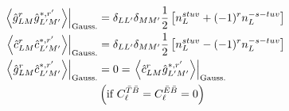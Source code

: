 \documentclass{article}
\newcommand{\av}[1]{\left\langle #1 \right\rangle}
\begin{document}
\begin{equation}
\begin{split}
\left.\av{\hat g^{r}_{LM} \hat g^{*, r'}_{L' M'} }\right|_{\rm Gauss.} &=\delta_{LL'}\delta_{MM'} \frac 12 \left[n_L^{stuv} +  (-1)^{r} n^{-s-tuv}_L\right] \\
		\left.\av{\hat c^{r}_{LM} \hat c^{*, r'}_{L' M'} }\right|_{\rm Gauss.} &= \delta_{LL'}\delta_{MM'}\frac 12 \left[n_L^{stuv} -  (-1)^{r} n^{-s-tuv}_L\right] \\
	\left.\av{\hat g^{r}_{LM} \hat c^{*, r'}_{L' M'} }\right|_{\rm Gauss.} &= 0 = \left.\av{\hat c^{r}_{LM} \hat g^{*, r'}_{L' M'} }\right|_{\rm Gauss.} \\
	&\left(\textrm{if   } C_\ell^{\bar T \bar B} =  C_\ell^{\bar E \bar B} = 0\right)
\end{split}
\end{equation}
\end{document}
